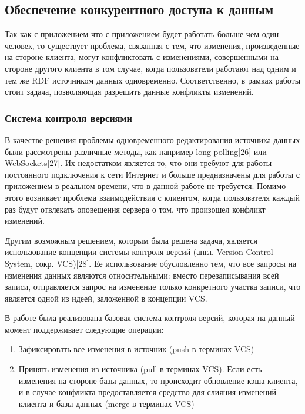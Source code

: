 \documentclass[12pt]{article}
\begin{document}
\subsection{Обеспечение конкурентного доступа к данным}
Так как с приложением что с приложением будет работать больше чем один человек, то существует проблема, связанная с тем, что изменения, произведенные на стороне клиента, могут конфликтовать с изменениями, совершенными на стороне другого клиента в том случае, когда пользователи работают над одним и тем же RDF источником данных одновременно. Соответственно, в рамках работы стоит задача, позволяющая разрешить данные конфликты изменений.

\subsubsection{Система контроля версиями}
\qquad В качестве решения проблемы одновременного редактирования источника данных были рассмотрены различные методы, как например long-polling[26] или WebSockets[27]. Их недостатком является то, что они требуют для работы постоянного подключения к сети Интернет и больше предназначены для работы с приложением в реальном времени, что в данной работе не требуется. Помимо этого возникает проблема взаимодействия с клиентом, когда пользователя каждый раз будут отвлекать оповещения сервера о том, что произошел конфликт изменений.

Другим возможным решением, которым была решена задача, является использование концепции системы контроля версий (англ. Version Control System, сокр. VCS)[28]. Ее использование обусловленно тем, что все запросы на изменения данных являются относительными: вместо перезаписывания всей записи, отправляется запрос на изменение только конкретного участка записи, что является одной из идеей, заложенной в концепции VCS.

В работе была реализована базовая система контроля версий, которая на данный момент поддерживает следующие операции:

\begin{enumerate}
    \item Зафиксировать все изменения в источник (push в терминах VCS)
    \item Принять изменения из источника (pull в терминах VCS). Если есть изменения на стороне базы данных, то происходит обновление кэша клиента, и в случае конфликта предоставляется средство для слияния изменений клиента и базы данных (merge в терминах VCS)
\end{enumerate}
\end{document}
